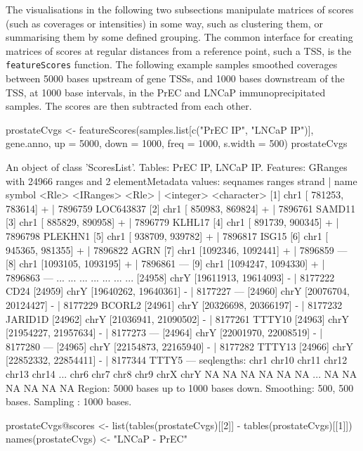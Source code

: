 The visualisations in the following two subsections manipulate matrices of scores (such as coverages or intensities) in some way, such as clustering them, or summarising them by some defined grouping. The common interface for creating matrices of scores at regular distances from a reference point, such a TSS, is the \texttt{featureScores} function. The following example samples smoothed coverages between 5000 bases upstream of gene TSSs, and 1000 bases downstream of the TSS, at 1000 base intervals, in the PrEC and LNCaP immunoprecipitated samples. The scores are then subtracted from each other.

\begin{Schunk}
\begin{Sinput}
 prostateCvgs <- featureScores(samples.list[c("PrEC IP", "LNCaP IP")], gene.anno,
                               up = 5000, down = 1000, freq = 1000, s.width = 500)
 prostateCvgs
\end{Sinput}
\begin{Soutput}
An object of class 'ScoresList'.
Tables: PrEC IP, LNCaP IP.
Features:
GRanges with 24966 ranges and 2 elementMetadata values:
          seqnames               ranges strand   |      name      symbol
             <Rle>            <IRanges>  <Rle>   | <integer> <character>
      [1]     chr1   [ 781253,  783614]      +   |   7896759   LOC643837
      [2]     chr1   [ 850983,  869824]      +   |   7896761      SAMD11
      [3]     chr1   [ 885829,  890958]      +   |   7896779      KLHL17
      [4]     chr1   [ 891739,  900345]      +   |   7896798     PLEKHN1
      [5]     chr1   [ 938709,  939782]      +   |   7896817       ISG15
      [6]     chr1   [ 945365,  981355]      +   |   7896822        AGRN
      [7]     chr1   [1092346, 1092441]      +   |   7896859         ---
      [8]     chr1   [1093105, 1093195]      +   |   7896861         ---
      [9]     chr1   [1094247, 1094330]      +   |   7896863         ---
      ...      ...                  ...    ... ...       ...         ...
  [24958]     chrY [19611913, 19614093]      -   |   8177222        CD24
  [24959]     chrY [19640262, 19640361]      -   |   8177227         ---
  [24960]     chrY [20076704, 20124427]      -   |   8177229      BCORL2
  [24961]     chrY [20326698, 20366197]      -   |   8177232     JARID1D
  [24962]     chrY [21036941, 21090502]      -   |   8177261      TTTY10
  [24963]     chrY [21954227, 21957634]      -   |   8177273         ---
  [24964]     chrY [22001970, 22008519]      -   |   8177280         ---
  [24965]     chrY [22154873, 22165940]      -   |   8177282      TTTY13
  [24966]     chrY [22852332, 22854411]      -   |   8177344       TTTY5
  ---
  seqlengths:
    chr1 chr10 chr11 chr12 chr13 chr14 ...  chr6  chr7  chr8  chr9  chrX  chrY
      NA    NA    NA    NA    NA    NA ...    NA    NA    NA    NA    NA    NA
Region: 5000 bases up to 1000 bases down.
Smoothing: 500, 500 bases.
Sampling : 1000 bases.
\end{Soutput}
\begin{Sinput}
 prostateCvgs@scores <- list(tables(prostateCvgs)[[2]] - tables(prostateCvgs)[[1]])
 names(prostateCvgs) <- "LNCaP - PrEC"
\end{Sinput}
\end{Schunk}

